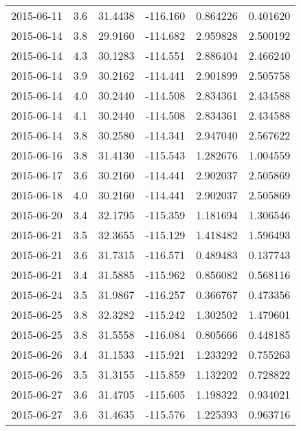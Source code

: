 \begin{tabular}{lrrrrr}
2015-06-11 &       3.6 &  31.4438 &  -116.160 &         0.864226 &         0.401620 \\
2015-06-14 &       3.8 &  29.9160 &  -114.682 &         2.959828 &         2.500192 \\
2015-06-14 &       4.3 &  30.1283 &  -114.551 &         2.886404 &         2.466240 \\
2015-06-14 &       3.9 &  30.2162 &  -114.441 &         2.901899 &         2.505758 \\
2015-06-14 &       4.0 &  30.2440 &  -114.508 &         2.834361 &         2.434588 \\
2015-06-14 &       4.1 &  30.2440 &  -114.508 &         2.834361 &         2.434588 \\
2015-06-14 &       3.8 &  30.2580 &  -114.341 &         2.947040 &         2.567622 \\
2015-06-16 &       3.8 &  31.4130 &  -115.543 &         1.282676 &         1.004559 \\
2015-06-17 &       3.6 &  30.2160 &  -114.441 &         2.902037 &         2.505869 \\
2015-06-18 &       4.0 &  30.2160 &  -114.441 &         2.902037 &         2.505869 \\
2015-06-20 &       3.4 &  32.1795 &  -115.359 &         1.181694 &         1.306546 \\
2015-06-21 &       3.5 &  32.3655 &  -115.129 &         1.418482 &         1.596493 \\
2015-06-21 &       3.6 &  31.7315 &  -116.571 &         0.489483 &         0.137743 \\
2015-06-21 &       3.4 &  31.5885 &  -115.962 &         0.856082 &         0.568116 \\
2015-06-24 &       3.5 &  31.9867 &  -116.257 &         0.366767 &         0.473356 \\
2015-06-25 &       3.8 &  32.3282 &  -115.242 &         1.302502 &         1.479601 \\
2015-06-25 &       3.8 &  31.5558 &  -116.084 &         0.805666 &         0.448185 \\
2015-06-26 &       3.4 &  31.1533 &  -115.921 &         1.233292 &         0.755263 \\
2015-06-26 &       3.5 &  31.3155 &  -115.859 &         1.132202 &         0.728822 \\
2015-06-27 &       3.6 &  31.4705 &  -115.605 &         1.198322 &         0.934021 \\
2015-06-27 &       3.6 &  31.4635 &  -115.576 &         1.225393 &         0.963716 \\

\end{tabular}
